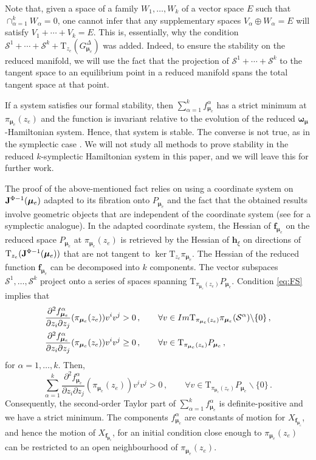 \documentclass[11pt]{article}
\theoremstyle{plain}
\theoremstyle{definition}
\newcommand{\T}{\mathrm{T}}
\newcommand{\bomega}{{\boldsymbol{\omega}}}
\newcommand{\bh}{{\boldsymbol{h}}}
\numberwithin{equation}{section}
\begin{document}
Note that, given a space of a family $W_1,\ldots,W_k$ of a vector space $E$ such that $\cap_{\alpha=1}^kW_\alpha=0$, one cannot infer that any supplementary spaces $V_\alpha\oplus W_\alpha=E$ will satisfy $V_1+\dotsb+V_k=E$. This is, essentially, why the condition $\mathcal{S}^1+\dotsb+\mathcal{S}^k+\T_{z_e}(G^\Delta_{\bm \mu _e})$ was added. Indeed, to ensure the stability on the reduced manifold, we will use the fact that the projection of $\mathcal{S}^1+\dotsb+\mathcal{S}^k$ to the tangent space to an equilibrium point in a reduced manifold spans the total tangent space at that point. 


If a system satisfies our formal stability, then $\sum_{\alpha=1}^kf^\alpha_{\bm \mu_e}$ has a strict minimum at $\pi_{\bm\mu_e}(z_e)$ and the function is invariant relative to the evolution of the reduced $\bomega_{\bm\mu}$-Hamiltonian system. Hence, that system is stable. The converse is not true, as in the symplectic case \cite{AM_78}. We will not study all methods to prove stability in the reduced $k$-symplectic Hamiltonian system in this paper, and we will leave this for further work. 

The proof of the above-mentioned fact relies on using a coordinate system on ${\bf J}^{\Phi-1}(\bm \mu_e)$ adapted to its fibration onto $P_{\bm\mu_e}$ and the fact that the obtained results involve geometric objects that are independent of the coordinate system (see \cite{LZ_21,Zaw_21} for a symplectic analogue). In the adapted coordinate system, the Hessian of $\boldsymbol{f}_{\bm\mu_e}$ on the reduced space $P_{\bm\mu_e}$ at $\pi_{\bm\mu_e}(z_e)$ is retrieved by the Hessian of ${\bh}_\xi$  on directions of $\T_{z_e}({\bf J}^{\Phi-1}(\bm\mu_e))$ that are not tangent to $\ker \T_{z_e}\pi_{\bm \mu_e}$. The Hessian of the reduced function $\boldsymbol{f}_{\bm \mu_e}$ can be decomposed into $k$ components. The vector subspaces $\mathcal{S}^1,\ldots,\mathcal{S}^k$ project onto a series of spaces spanning $\T_{\pi_{\bm\mu_e}(z_e)}P_{\bm \mu_e}$. Condition \eqref{eq:FS} implies that 
\begin{align}
\frac{\partial^2f^\alpha_{\bm\mu_e}}{\partial z_i\partial z_j}(\pi_{\bm \mu_e}(z_e))v^iv^j &> 0\,,\qquad \forall v\in {\rm Im}\T_{\pi_{\bm\mu_e}(z_e)}\pi_{\bm\mu_e}(\mathcal{S}^\alpha)\backslash\{0\}\,,\\ \frac{\partial^2f^\alpha_{\bm\mu_e}}{\partial z_i\partial z_j}(\pi_{\bm \mu_e}(z_e))v^iv^j &\geq  0\,,\qquad \forall v\in \T_{\pi_{\bm\mu_e}(z_e)}P_{\bm\mu_e}\,,
\end{align}
for $\alpha=1,\ldots,k$.  Then, 
$$
\sum_{\alpha=1}^k\frac{\partial^2f^\alpha_{\bm\mu_e}}{\partial z_i\partial z_j}(\pi_{\bm \mu_e}(z_e))v^iv^j>0\,,\qquad \forall v\in \T_{\pi_{\bm\mu_e}(z_e)}P_{\bm\mu_e}\backslash\{0\}\,.
$$
Consequently, the second-order Taylor part of $\sum_{\alpha=1}^kf_{\bm\mu_e}^\alpha$ is definite-positive and we have a strict minimum. The components $f^\alpha_{\bm \mu_e}$ are constants of motion for $X_{\boldsymbol{f}_{\bm \mu_e}}$, and hence the motion of $X_{\boldsymbol{f}_{\bm \mu_e}}$, for an initial condition close enough to $\pi_{\bm\mu_e}(z_e)$ can be restricted to an open neighbourhood of $\pi_{\bm\mu_e}(z_e)$.
\end{document}
